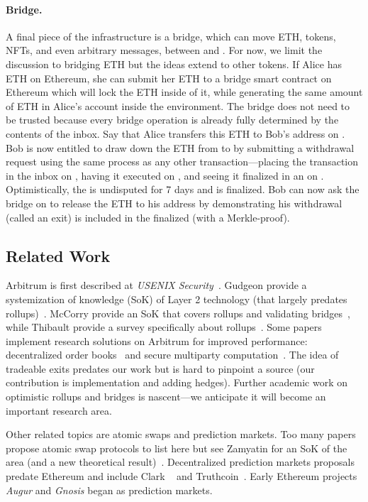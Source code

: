 \paragraph*{Bridge.} A final piece of the \layertwo infrastructure is a bridge, which can move ETH, tokens, NFTs, and even arbitrary messages, between \layerone and \layertwo. For now, we limit the discussion to bridging ETH but the ideas extend to other tokens. If Alice has ETH on Ethereum, she can submit her ETH to a bridge smart contract on Ethereum which will lock the ETH inside of it, while generating the same amount of ETH in Alice's account inside the \layertwo environment. The bridge does not need to be trusted because every bridge operation is already fully determined by the contents of the inbox. Say that Alice transfers this ETH to Bob's address on \layertwo. Bob is now entitled to draw down the ETH from \layertwo to \layerone by submitting a withdrawal request using the same process as any other \layertwo transaction---\ie placing the transaction in the inbox on \layerone, having it executed on \layertwo, and seeing it finalized in an \rblock on \layerone. Optimistically, the \rblock is undisputed for 7 days and is finalized. Bob can now ask the bridge on \layerone to release the ETH to his address by demonstrating his withdrawal (called an exit) is included in the finalized \rblock (\eg with a Merkle-proof).

\subsection{Related Work} 

Arbitrum is first described at \textit{USENIX Security}~\cite{kalodner2018arbitrum}. Gudgeon \etal provide a systemization of knowledge (SoK) of Layer 2 technology (that largely predates rollups)~\cite{gudgeon2019sok}. McCorry \etal provide an SoK that covers rollups and validating bridges~\cite{mccorry2021sok}, while Thibault \etal provide a survey specifically about rollups~\cite{Tre22}. Some papers implement research solutions on Arbitrum for improved performance:  decentralized order books~\cite{moosavi2021lissy} and secure multiparty computation~\cite{demirag2021absentia}. The idea of tradeable exits predates our work but is hard to pinpoint a source (our contribution is implementation and adding hedges). Further academic work on optimistic rollups and bridges is nascent---we anticipate it will become an important research area.  

Other related topics are atomic swaps and prediction markets. Too many papers propose atomic swap protocols to list here but see Zamyatin \etal for an SoK of the area (and a new theoretical result)~\cite{zamyatin2021sok}. Decentralized prediction markets proposals predate Ethereum and include Clark \etal~\cite{clark2014decentralizing} and Truthcoin~\cite{sztorc2015truthcoin}. Early Ethereum projects \textit{Augur} and \textit{Gnosis} began as prediction markets. 

